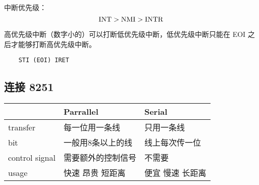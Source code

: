 中断优先级：
\begin{equation}\nonumber
	\rm	INT > NMI > INTR
\end{equation}

高优先级中断（数字小的）可以打断低优先级中断，低优先级中断只能在 EOI 之后才能够打断高优先级中断。
\begin{verbatim}
	STI	(EOI) IRET
\end{verbatim}

\subsection{连接 8251}
\begin{tabular}{|p{4em}|p{5em}|p{5em}|}
	\hline
	&\bfseries Parrallel &\bfseries Serial \\
	\hline
	transfer & 每一位用一条线 & 只用一条线 \\
	\hline
	bit & 一般用8条以上的线 & 线上每次传一位 \\
	\hline
	control signal & 需要额外的控制信号 & 不需要 \\
	\hline
	usage & 快速 昂贵 短距离 & 便宜 慢速 长距离 \\
	\hline
\end{tabular}